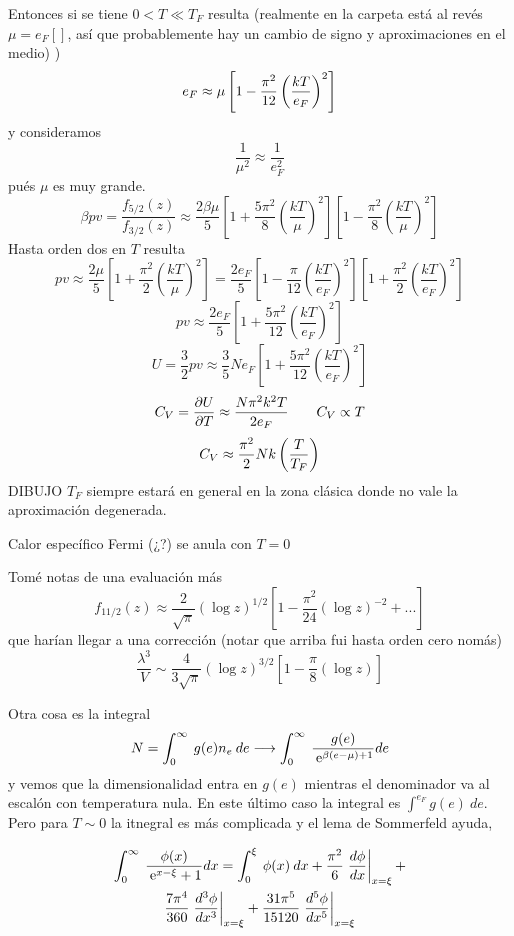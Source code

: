 \documentclass[10pt,oneside]{CBFT_book}
\begin{document}
\begin{itemize}
 Entonces si se tiene $0 < T \ll T_F$ resulta (realmente en la carpeta está al revés $\mu = e_F[]$, así
 que probablemente hay un cambio de signo y aproximaciones en el medio)
 )
 \[
	e_F \approx \mu \left[ 1 - \frac{\pi^2}{12}\Frac{ kT }{ e_F }^2 \right]
 \]
 y consideramos
 \[
	\frac{1}{\mu^2} \approx \frac{1}{e_F^2}
 \]
 pués $ \mu $ es muy grande.
 \[
	\beta p v = \frac{ f_{5/2}(z) }{ f_{3/2}(z) } \approx \frac{ 2 \beta \mu }{ 5 } 
	\left[ 1 + \frac{ 5\pi^2 }{ 8 } \left( \frac{kT}{\mu} \right)^2 \right]
	\left[ 1 - \frac{ \pi^2 }{ 8 } \left( \frac{kT}{\mu} \right)^2 \right]
 \]
 Hasta orden dos en $ T $ resulta 
 \[
	pv \approx \frac{ 2 \mu }{ 5 } \left[ 1 + \frac{ \pi^2 }{ 2 } \left( \frac{kT}{\mu} \right)^2 \right] =
	\frac{ 2 e_F }{ 5 }\left[ 1 - \frac{ \pi }{ 12 } \left( \frac{kT}{e_F} \right)^2 \right] 
	\left[ 1 + \frac{ \pi^2 }{ 2 } \left( \frac{kT}{e_F} \right)^2 \right] 
 \]
 \[
	pv \approx \frac{ 2 e_F }{ 5 } \left[ 1 + \frac{ 5 \pi^2 }{ 12 } \left( \frac{kT}{e_F} \right)^2 \right] 
 \]
 \[
	U = \frac{3}{2} p v \approx \frac{3}{5} N e_F 
	\left[ 1 + \frac{ 5 \pi^2 }{ 12 } \left( \frac{kT}{e_F} \right)^2 \right] 
 \]
 \[
	C_V = \dpar{U}{T} \approx \frac{ N \pi^2 k^2 T }{ 2e_F } \qquad C_V \propto T
 \]
 \[
	C_V \approx \frac{\pi^2}{2} Nk \Frac{T}{T_F}
 \]
 DIBUJO 
 $T_F$ siempre estará en general en la zona clásica donde no vale la aproximación degenerada.
 
 Calor específico Fermi (¿?) se anula con $ T = 0 $
 
 Tomé notas de una evaluación más
 \[
	f_{11/2}(z) \approx \frac{2}{\sqrt{\pi}}(\log z)^{1/2} \left[ 1 - \frac{\pi^2}{24}(\log z)^{-2} + ... \right]
 \]
 que harían llegar a una corrección (notar que arriba fui hasta orden cero nomás)
 \[
	\frac{\lambda^3}{V} \sim \frac{4}{3\sqrt{\pi}} (\log z)^{3/2} \left[ 1 - \frac{\pi}{8}(\log z) \right]
 \]
 
 Otra cosa es la integral
 \[
	N = \int_0^\infty \: g(e) n_e \: de \longrightarrow 
	\int_0^\infty \: \frac{g(e)}{ \euler^{\beta(e-\mu)+1}} de
 \]
 y vemos que la dimensionalidad entra en $g(e)$ mientras el denominador va al escalón con temperatura nula.
 En este último caso la integral es $\int^{e_F} g(e) \: de$. Pero para $T \sim 0$ la itnegral es más complicada
 y el lema de Sommerfeld ayuda,

 \begin{multline*}
	\int_0^\infty \: \frac{\phi(x)}{ \euler^{x-\xi} + 1} dx = 
	\int_0^\xi \: \phi(x) \: dx + \frac{\pi^2}{6} \dtote{\phi}{x}{x=\xi}  +\\
	\frac{7\pi^4}{360} \dtote[3]{\phi}{x}{x=\xi}  + \frac{31\pi^5}{15120} \dtote[5]{\phi}{x}{x=\xi} 
 \end{multline*}


\end{itemize}
\end{document}
